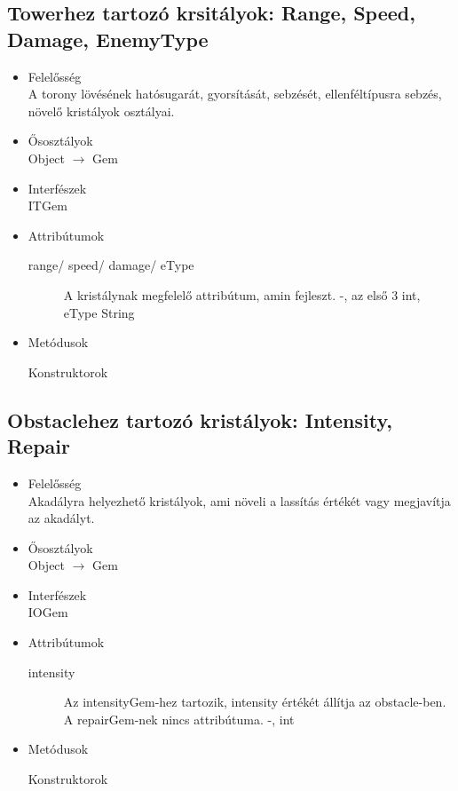 \subsection{Towerhez tartozó krsitályok: Range, Speed, Damage, EnemyType}
\begin{itemize}
\item Felelősség\\
A torony lövésének hatósugarát, gyorsítását, sebzését, ellenféltípusra sebzés, növelő kristályok osztályai.
\item Ősosztályok\\
Object $\rightarrow$ Gem
\item Interfészek\\
ITGem
\item Attribútumok\\
	\begin{description}
		\item[range/ speed/ damage/ eType] A kristálynak megfelelő attribútum, amin fejleszt. -, az első 3 int, eType String
		
	\end{description}
\item Metódusok\\
	\begin{description}
		\item[Konstruktorok]
		
	\end{description}
\end{itemize}
\subsection{Obstaclehez tartozó kristályok: Intensity, Repair}
\begin{itemize}
\item Felelősség\\
Akadályra helyezhető kristályok, ami növeli a lassítás értékét vagy megjavítja az akadályt.
\item Ősosztályok\\
Object $\rightarrow$ Gem
\item Interfészek\\
IOGem

\item Attribútumok\\
	\begin{description}
		\item[intensity] Az intensityGem-hez tartozik, intensity értékét állítja az obstacle-ben. A repairGem-nek nincs attribútuma. -, int
		
		
	\end{description}
\item Metódusok\\
	\begin{description}
		\item[Konstruktorok]
		
	\end{description}
\end{itemize}
